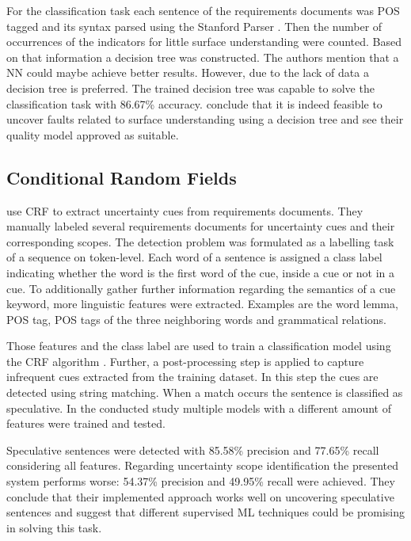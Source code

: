 For the classification task each sentence of the requirements documents was \ac{POS} tagged and its syntax parsed using the Stanford Parser \parencite{Klein:2002}.
Then the number of occurrences of the indicators for little surface understanding were counted.
Based on that information a decision tree was constructed.
The authors mention that a \ac{NN} could maybe achieve better results.
However, due to the lack of data a decision tree is preferred.
The trained decision tree was capable to solve the classification task with 86.67\% accuracy.
\textcite{Ormandjieva:2007} conclude that it is indeed feasible to uncover faults related to surface understanding using a decision tree and see their quality model approved as suitable.

\subsection{Conditional Random Fields}
\textcite{Yang:2012} use \ac{CRF} to extract uncertainty cues from requirements documents.
They manually labeled several requirements documents for uncertainty cues and their corresponding scopes.
The detection problem was formulated as a labelling task of a sequence on token-level.
Each word of a sentence is assigned a class label indicating whether the word is the first word of the cue, inside a cue or not in a cue.
To additionally gather further information regarding the semantics of a cue keyword, more linguistic features were extracted.
Examples are the word lemma, \ac{POS} tag, \ac{POS} tags of the three neighboring words and grammatical relations.

Those features and the class label are used to train a classification model using the \ac{CRF} algorithm \parencite{Lafferty:2001}.
Further, a post-processing step is applied to capture infrequent cues extracted from the training dataset.
In this step the cues are detected using string matching.
When a match occurs the sentence is classified as speculative.
In the conducted study multiple models with a different amount of features were trained and tested.

Speculative sentences were detected with 85.58\% precision and 77.65\% recall considering all features.
Regarding uncertainty scope identification the presented system performs worse: 54.37\% precision and 49.95\% recall were achieved.
They conclude that their implemented approach works well on uncovering speculative sentences and suggest that different supervised \ac{ML} techniques could be promising in solving this task.

